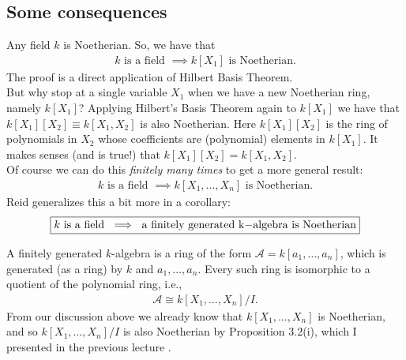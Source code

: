\documentclass[12pt]{article}
\begin{document}
\newpage

\subsection{Some consequences}


Any field $k$ is Noetherian. So, we have that
\begin{align*}
{k \text{ is a field } \implies k[X_1] \text{ is Noetherian.}} 
\end{align*}
The proof is a direct application of Hilbert Basis Theorem. \\

But why stop at a single variable $X_1$ when we have a new Noetherian ring, namely $k[X_1]$? Applying Hilbert's Basis Theorem again to $k[X_1]$ we have that $k[X_1][X_2] \equiv k[X_1,X_2]$ is also Noetherian. Here $k[X_1][X_2]$ is the ring of polynomials in $X_2$ whose coefficients are (polynomial) elements in $k[X_1]$. It makes senses (and is true!) that $k[X_1][X_2] = k[X_1,X_2]$. \\

 Of course we can do this \textit{finitely many times} to get a more general result:
\begin{align*}
{k \text{ is a field } \implies k[X_1,\dots,X_n] \text{ is Noetherian.}} 
\end{align*}
\noindent Reid generalizes this a bit more in a  corollary: 
\begin{align*}
\boxed{k \text{ is a field } \implies \text{ a finitely generated }$k$-\text{algebra is Noetherian}} 
\end{align*}

A finitely generated $k$-algebra is a ring of the form $\mathcal{A} = k[a_1,\dots,a_n]$, which is generated (as a ring) by $k$ and $a_1,\dots,a_n$. Every such ring is isomorphic to a quotient of the polynomial ring, i.e.,
\begin{align*}
\mathcal{A} \cong k[X_1,\dots,X_n]/I.
\end{align*}
From our discussion above we already know that $k[X_1,\dots,X_n]$ is Noetherian, and so $k[X_1,\dots,X_n]/I$ is also Noetherian by Proposition 3.2(i), which I presented in the previous lecture \smiley{}.
\end{document}
